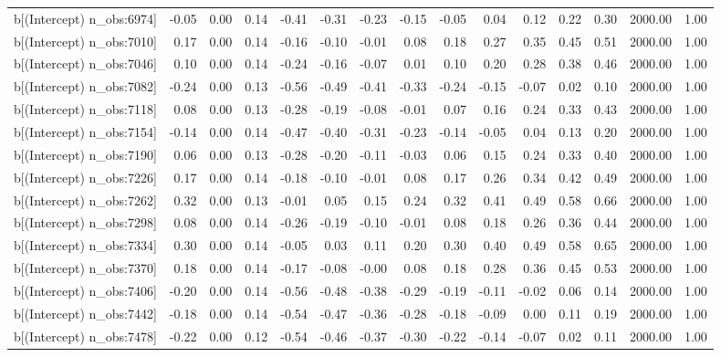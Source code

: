 \begin{table}[ht]
\begin{tabular}{rrrrrrrrrrrrrrr}
  b[(Intercept) n\_obs:6974] & -0.05 & 0.00 & 0.14 & -0.41 & -0.31 & -0.23 & -0.15 & -0.05 & 0.04 & 0.12 & 0.22 & 0.30 & 2000.00 & 1.00 \\ 
  b[(Intercept) n\_obs:7010] & 0.17 & 0.00 & 0.14 & -0.16 & -0.10 & -0.01 & 0.08 & 0.18 & 0.27 & 0.35 & 0.45 & 0.51 & 2000.00 & 1.00 \\ 
  b[(Intercept) n\_obs:7046] & 0.10 & 0.00 & 0.14 & -0.24 & -0.16 & -0.07 & 0.01 & 0.10 & 0.20 & 0.28 & 0.38 & 0.46 & 2000.00 & 1.00 \\ 
  b[(Intercept) n\_obs:7082] & -0.24 & 0.00 & 0.13 & -0.56 & -0.49 & -0.41 & -0.33 & -0.24 & -0.15 & -0.07 & 0.02 & 0.10 & 2000.00 & 1.00 \\ 
  b[(Intercept) n\_obs:7118] & 0.08 & 0.00 & 0.13 & -0.28 & -0.19 & -0.08 & -0.01 & 0.07 & 0.16 & 0.24 & 0.33 & 0.43 & 2000.00 & 1.00 \\ 
  b[(Intercept) n\_obs:7154] & -0.14 & 0.00 & 0.14 & -0.47 & -0.40 & -0.31 & -0.23 & -0.14 & -0.05 & 0.04 & 0.13 & 0.20 & 2000.00 & 1.00 \\ 
  b[(Intercept) n\_obs:7190] & 0.06 & 0.00 & 0.13 & -0.28 & -0.20 & -0.11 & -0.03 & 0.06 & 0.15 & 0.24 & 0.33 & 0.40 & 2000.00 & 1.00 \\ 
  b[(Intercept) n\_obs:7226] & 0.17 & 0.00 & 0.14 & -0.18 & -0.10 & -0.01 & 0.08 & 0.17 & 0.26 & 0.34 & 0.42 & 0.49 & 2000.00 & 1.00 \\ 
  b[(Intercept) n\_obs:7262] & 0.32 & 0.00 & 0.13 & -0.01 & 0.05 & 0.15 & 0.24 & 0.32 & 0.41 & 0.49 & 0.58 & 0.66 & 2000.00 & 1.00 \\ 
  b[(Intercept) n\_obs:7298] & 0.08 & 0.00 & 0.14 & -0.26 & -0.19 & -0.10 & -0.01 & 0.08 & 0.18 & 0.26 & 0.36 & 0.44 & 2000.00 & 1.00 \\ 
  b[(Intercept) n\_obs:7334] & 0.30 & 0.00 & 0.14 & -0.05 & 0.03 & 0.11 & 0.20 & 0.30 & 0.40 & 0.49 & 0.58 & 0.65 & 2000.00 & 1.00 \\ 
  b[(Intercept) n\_obs:7370] & 0.18 & 0.00 & 0.14 & -0.17 & -0.08 & -0.00 & 0.08 & 0.18 & 0.28 & 0.36 & 0.45 & 0.53 & 2000.00 & 1.00 \\ 
  b[(Intercept) n\_obs:7406] & -0.20 & 0.00 & 0.14 & -0.56 & -0.48 & -0.38 & -0.29 & -0.19 & -0.11 & -0.02 & 0.06 & 0.14 & 2000.00 & 1.00 \\ 
  b[(Intercept) n\_obs:7442] & -0.18 & 0.00 & 0.14 & -0.54 & -0.47 & -0.36 & -0.28 & -0.18 & -0.09 & 0.00 & 0.11 & 0.19 & 2000.00 & 1.00 \\ 
  b[(Intercept) n\_obs:7478] & -0.22 & 0.00 & 0.12 & -0.54 & -0.46 & -0.37 & -0.30 & -0.22 & -0.14 & -0.07 & 0.02 & 0.11 & 2000.00 & 1.00 \\ 

\end{tabular}
\end{table}
